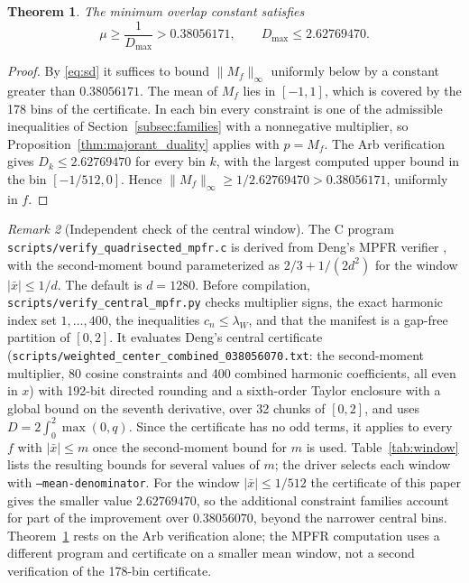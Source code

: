 \documentclass[11pt,a4paper]{article}
\newtheorem{theorem}{Theorem}[section]
\theoremstyle{definition}
\theoremstyle{remark}
\newtheorem{remark}[theorem]{Remark}
\begin{document}
\begin{theorem}
\label{thm:main}
The minimum overlap constant satisfies
\begin{equation}
\mu \ge \frac{1}{D_{\max}} > 0.38056171, \qquad D_{\max} \le 2.62769470.
\end{equation}
\end{theorem}
\begin{proof}
By \eqref{eq:sd} it suffices to bound $\|M_f\|_\infty$ uniformly below by a constant greater than $0.38056171$. The mean of $M_f$ lies in $[-1, 1]$, which is covered by the 178 bins of the certificate. In each bin every constraint is one of the admissible inequalities of Section~\ref{subsec:families} with a nonnegative multiplier, so Proposition~\ref{thm:majorant_duality} applies with $p = M_f$. The Arb verification gives $D_k \le 2.62769470$ for every bin $k$, with the largest computed upper bound in the bin $[-1/512,0]$. Hence $\|M_f\|_\infty \ge 1/2.62769470 > 0.38056171$, uniformly in $f$.
\end{proof}

\begin{remark}[Independent check of the central window]
\label{rem:mpfr}
The C program \nolinkurl{scripts/verify_quadrisected_mpfr.c} is derived from Deng's MPFR verifier \cite{deng2026}, with the second-moment bound parameterized as $2/3+1/(2d^2)$ for the window $|\bar{x}|\le 1/d$. The default is $d=1280$. Before compilation, \nolinkurl{scripts/verify_central_mpfr.py} checks multiplier signs, the exact harmonic index set $1,\ldots,400$, the inequalities $c_n\le\lambda_W$, and that the manifest is a gap-free partition of $[0,2]$. It evaluates Deng's central certificate (\nolinkurl{scripts/weighted_center_combined_038056070.txt}: the second-moment multiplier, 80 cosine constraints and 400 combined harmonic coefficients, all even in $x$) with 192-bit directed rounding and a sixth-order Taylor enclosure with a global bound on the seventh derivative, over 32 chunks of $[0, 2]$, and uses $D = 2\int_0^2 \max(0, q)$. Since the certificate has no odd terms, it applies to every $f$ with $|\bar{x}| \le m$ once the second-moment bound for $m$ is used. Table~\ref{tab:window} lists the resulting bounds for several values of $m$; the driver selects each window with \texttt{--mean-denominator}. For the window $|\bar{x}| \le 1/512$ the certificate of this paper gives the smaller value $2.62769470$, so the additional constraint families account for part of the improvement over $0.38056070$, beyond the narrower central bins. Theorem~\ref{thm:main} rests on the Arb verification alone; the MPFR computation uses a different program and certificate on a smaller mean window, not a second verification of the 178-bin certificate.
\end{remark}
\end{document}
